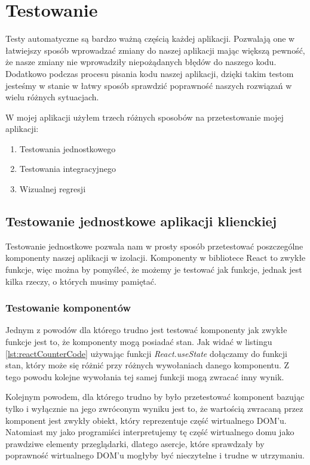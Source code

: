 \newpage
\section{Testowanie}
Testy automatyczne są bardzo ważną częścią każdej aplikacji. Pozwalają one w łatwiejszy sposób wprowadzać zmiany do naszej aplikacji mając większą pewność, że nasze zmiany nie wprowadziły niepożądanych błędów do naszego kodu. Dodatkowo podczas procesu pisania kodu naszej aplikacji, dzięki takim testom jesteśmy w stanie w łatwy sposób sprawdzić poprawność naszych rozwiązań w wielu różnych sytuacjach. 

W mojej aplikacji użyłem trzech różnych sposobów na przetestowanie mojej aplikacji:
\begin{enumerate}
  \item Testowania jednostkowego
  \item Testowania integracyjnego
  \item Wizualnej regresji
\end{enumerate}

\subsection{Testowanie jednostkowe aplikacji klienckiej}
Testowanie jednostkowe pozwala nam w prosty sposób przetestować poszczególne komponenty naszej aplikacji w izolacji. Komponenty w bibliotece React to zwykłe funkcje, więc można by pomyśleć, że możemy je testować jak funkcje, jednak jest kilka rzeczy, o których musimy pamiętać. 

\subsubsection{Testowanie komponentów}
Jednym z powodów dla którego trudno jest testować komponenty jak zwykłe funkcje jest to, że komponenty mogą posiadać stan. Jak widać w listingu \ref{lst:reactCounterCode} używając funkcji \emph{React.useState} dołączamy do funkcji stan, który może się różnić przy różnych wywołaniach danego komponentu. Z tego powodu kolejne wywołania tej samej funkcji mogą zwracać inny wynik. 

Kolejnym powodem, dla którego trudno by było przetestować komponent bazując tylko i wyłącznie na jego zwróconym wyniku jest to, że wartością zwracaną przez komponent jest zwykły obiekt, który reprezentuje część wirtualnego DOM'u. Natomiast my jako programiści interpretujemy tę część wirtualnego domu jako prawdziwe elementy przeglądarki, dlatego asercje, które sprawdzały by poprawność wirtualnego DOM'u mogłyby być nieczytelne i trudne w utrzymaniu.

